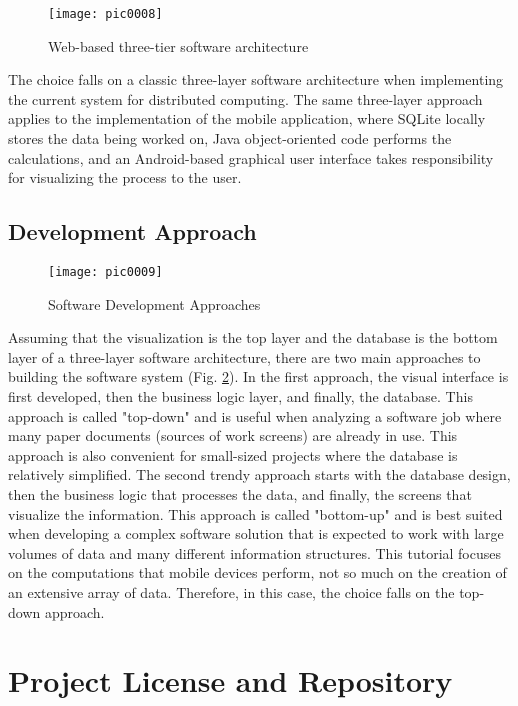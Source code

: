 \begin{figure}[h]
\centering
\texttt{[image: pic0008]}
\caption{Web-based three-tier software architecture}
\label{fig:pic0008}
\end{figure}

The choice falls on a classic three-layer software architecture when implementing the current system for distributed computing. The same three-layer approach applies to the implementation of the mobile application, where SQLite locally stores the data being worked on, Java object-oriented code performs the calculations, and an Android-based graphical user interface takes responsibility for visualizing the process to the user.

\subsection{Development Approach}

\begin{figure}[h]
\centering
\texttt{[image: pic0009]}
\caption{Software Development Approaches}
\label{fig:pic0009}
\end{figure}

Assuming that the visualization is the top layer and the database is the bottom layer of a three-layer software architecture, there are two main approaches to building the software system (Fig. \ref{fig:pic0009}). In the first approach, the visual interface is first developed, then the business logic layer, and finally, the database. This approach is called "top-down" and is useful when analyzing a software job where many paper documents (sources of work screens) are already in use. This approach is also convenient for small-sized projects where the database is relatively simplified. The second trendy approach starts with the database design, then the business logic that processes the data, and finally, the screens that visualize the information. This approach is called "bottom-up" and is best suited when developing a complex software solution that is expected to work with large volumes of data and many different information structures. This tutorial focuses on the computations that mobile devices perform, not so much on the creation of an extensive array of data. Therefore, in this case, the choice falls on the top-down approach.

\section{Project License and Repository}

